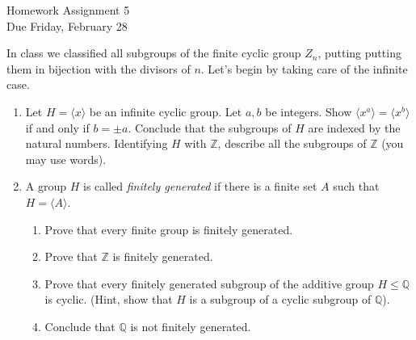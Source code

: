 \documentclass[11pt]{article}
\newcommand{\la}{\langle}
\newcommand{\ra}{\rangle}
\newcommand{\bQ}{\mathbb{Q}}
\newcommand{\bZ}{\mathbb{Z}}
\begin{document}
\begin{center}
\Large {Homework Assignment 5}\\
\small {Due Friday, February 28}
\end{center}
In class we classified all subgroups of the finite cyclic group $Z_n$, putting putting them in bijection with the divisors of $n$.  Let's begin by taking care of the infinite case.
\begin{enumerate}
  \item Let $H = \la x\ra$ be an infinite cyclic group.  Let $a,b$ be integers.  Show $\la x^a\ra = \la x^b\ra$ if and only if $b=\pm a$.  Conclude that the subgroups of $H$ are indexed by the natural numbers.  Identifying $H$ with $\bZ$, describe all the subgroups of $\bZ$ (you may use words).

  \item A group $H$ is called \textit{finitely generated} if there is a finite set $A$ such that $H = \la A\ra$.
  \begin{enumerate}
    \item Prove that every finite group is finitely generated.
    \item Prove that $\bZ$ is finitely generated.
    \item Prove that every finitely generated subgroup of the additive group $H\le\bQ$ is cyclic.  (Hint, show that $H$ is a subgroup of a cyclic subgroup of $\bQ$).
    \item Conclude that $\bQ$ is not finitely generated.
  \end{enumerate}


\end{enumerate}
\end{document}
